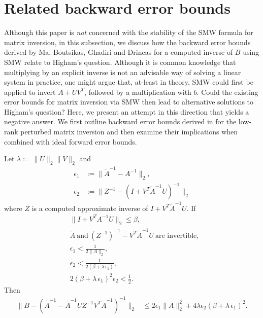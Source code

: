 \documentclass{siamltex}
\begin{document}
\section{Related backward error bounds} \label{backward_err_25:sec}
Although this paper is {\em not} concerned with the stability of the SMW formula for matrix inversion, in this subsection, we discuss how the backward error bounds derived by Ma, Boutsikas, Ghadiri and Drineas \cite{Ma25} for a computed inverse of $B$ using SMW relate to Higham's question. Although it is common knowledge that multiplying by an explicit inverse is not an advisable way of solving a linear system in practice, one might argue that, at-least in theory, SMW could first be applied to invert $A+UV^T$, followed by a multiplication with $b$. Could the existing error bounds for matrix inversion via SMW then lead to alternative solutions to Higham's question? Here, we present an attempt in this direction that yields a negative answer. We first outline backward error bounds derived in \cite{Ma25} for the low-rank perturbed matrix inversion and then examine their implications when combined with ideal forward error bounds.
\begin{proposition} \label{backward_thm_25}
\normalfont 
\cite[Thm. 6]{Ma25} 
Let $\lambda := \|U\|_2 \|V\|_2$ 
and 
\begin{align}
\epsilon_1 &:= \|\tilde{A}^{-1} - A^{-1} \|_2, \label{eqn:assumption1} \\
\epsilon_2 & := \|Z^{-1} - (I + V^T \tilde{A}^{-1} U)^{-1} \|_2 \label{eqn:assumption2}
\end{align}
where $Z$ is a computed approximate inverse of $I + V^T \tilde{A}^{-1} U$. If 
 \begin{align}
      & \| I + V^T A^{-1} U\|_2 \leq \beta, \nonumber\\ %
      & \widetilde{A}\ \text{and}\ (Z^{-1})^{-1} - V^T \widetilde{A}^{-1} U\ \text{are invertible},\nonumber\\
      & \epsilon_1 < \frac{1}{2 \|A\|_2},  \label{backward_thm_assumption1}\\
      & \epsilon_2 < \frac{1}{2 \left( \beta+ \lambda \, \epsilon_1  \right)},  \nonumber \\ %
      &  2\left( \beta+ \lambda \, \epsilon_1  \right)^2 \epsilon_2 < \frac{1}{2}. \nonumber%
\end{align}
Then
    \begin{align}
    \| B -\left(\widetilde{A}^{-1} - \widetilde{A}^{-1} U Z^{-1} V^T \widetilde{A}^{-1}\right)^{-1}\|_2 
    &\leq 2 \epsilon_1 \|A\|_2^2 + 4 \lambda\epsilon_2 \left(\beta+ \lambda \, \epsilon_1  \right)^2. \label{backward_fullbound}
\end{align}
\end{proposition}
\end{document}
